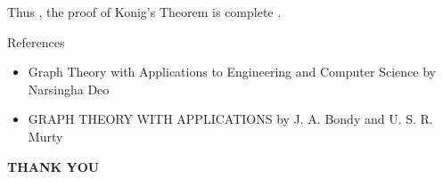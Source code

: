 \documentclass[12pt]{beamer}
\begin{document}
\begin{frame}
Thus , the proof of Konig's Theorem is complete .
\end{frame}

\begin{frame}{References}
        \begin{itemize}
            \item Graph Theory with Applications to Engineering and Computer Science by Narsingha Deo
            \item GRAPH THEORY WITH APPLICATIONS by J. A. Bondy and U. S. R. Murty
        \end{itemize}
    \end{frame}

\begin{frame}
\LARGE{\textbf{THANK YOU}} 
\end{frame}
\end{document}
